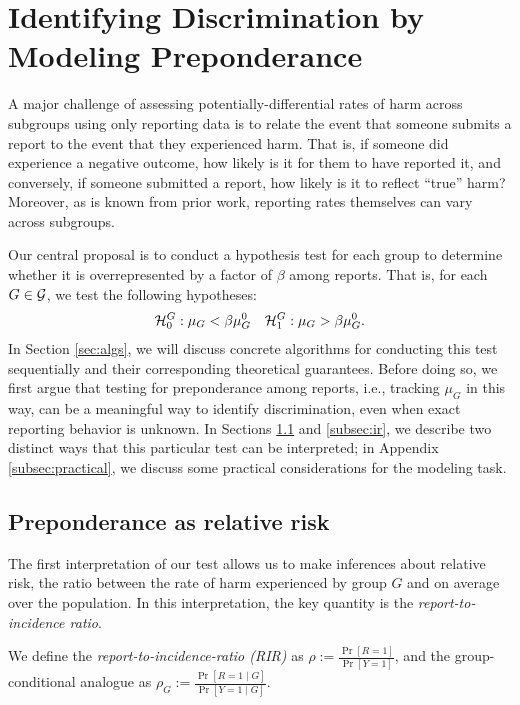 \section{Identifying Discrimination by Modeling Preponderance}
\label{sec:interpretation} 
A major challenge of assessing potentially-differential rates of harm across subgroups using only reporting data is to relate the event that someone submits a report to the event that they experienced harm. That is, if someone did experience a negative outcome, how likely is it for them to have reported it, and conversely, if someone submitted a report, how likely is it to reflect ``true'' harm? Moreover, as is known from prior work, reporting rates themselves can vary across subgroups. 

Our central proposal is to conduct a hypothesis test for each group to determine whether it is overrepresented by a factor of $\beta$ among reports. That is, for each $G \in {\mathcal{G}}$, we test the following hypotheses:
\begin{align}
\label{eq:htest}
    {\mathcal{H}_0^G}: \mu_G < \beta{\mu_G^0} && \mathcal{H}_1^G: \mu_G > \beta{\mu_G^0}.
\end{align}
In Section \ref{sec:algs}, we will discuss concrete algorithms for conducting this test sequentially and their corresponding theoretical guarantees. 
Before doing so, we first argue that testing for preponderance among reports, i.e., tracking $\mu_G$ in this way, can be a meaningful way to identify discrimination, even when exact reporting behavior is unknown. 
In Sections \ref{subsec:rr} and \ref{subsec:ir}, we describe two distinct ways that this particular test can be interpreted; in Appendix \ref{subsec:practical}, we discuss some practical considerations for the modeling task.

\subsection{Preponderance as relative risk} 
\label{subsec:rr}
The first interpretation of our test allows us to make inferences about relative risk, the ratio between the rate of harm experienced by group $G$ and on average over the population. 
In this interpretation, the key quantity is the \textit{report-to-incidence ratio}.
\begin{definition}
\label{def:rir}
We define the \emph{report-to-incidence-ratio (RIR)} as $\rho := \tfrac{\Pr[R = 1]}{\Pr[Y = 1]}$, and the group-conditional analogue as $\rho_G := \tfrac{\Pr[R = 1 \mid G ]}{\Pr[Y = 1 \mid G]}.$
\end{definition}

